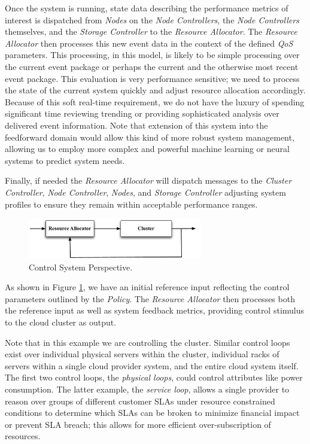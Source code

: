 \documentclass[10pt,letterpaper]{book}
\begin{document}
Once the system is running, state data describing the performance metrics of interest is dispatched from \textit{Nodes} on the \textit{Node Controllers}, the \textit{Node Controllers} themselves, and the \textit{Storage Controller} to the \textit{Resource Allocator}.  The \textit{Resource Allocator} then processes this new event data in the context of the defined \textit{QoS} parameters.  This processing, in this model, is likely to be simple processing over the current event package or perhaps the current and the otherwise most recent event package.  This evaluation is very performance sensitive; we need to process the state of the current system quickly and adjust resource allocation accordingly.  Because of this soft real-time requirement, we do not have the luxury of spending significant time reviewing trending or providing sophisticated analysis over delivered event information.  Note that extension of this system into the feedforward domain would allow this kind of more robust system management, allowing us to employ more complex and powerful machine learning or neural systems to predict system needs.

Finally, if needed the \textit{Resource Allocator} will dispatch messages to the \textit{Cluster Controller}, \textit{Node Controller}, \textit{Nodes}, and \textit{Storage Controller} adjusting system profiles to ensure they remain within acceptable performance ranges.

\begin{figure}[!t]
\centering
\includegraphics[width=3in]{feedback}
\caption{Control System Perspective.}
\label{fig:feedback}
\end{figure}

As shown in Figure \ref{fig:feedback}, we have an initial reference input reflecting the control parameters outlined by the \textit{Policy}.  The \textit{Resource Allocator} then processes both the reference input as well as system feedback metrics, providing control stimulus to the cloud cluster as output.

Note that in this example we are controlling the cluster.  Similar control loops exist over individual physical servers within the cluster, individual racks of servers within a single cloud provider system, and the entire cloud system itself. The first two control loops, the \textit{physical loops}, could control attributes like power consumption.  The latter example, the \textit{service loop}, allows a single provider to reason over groups of different customer SLAs under resource constrained conditions to determine which SLAs can be broken to minimize financial impact or prevent SLA breach; this allows for more efficient over-subscription of resources.
\end{document}

